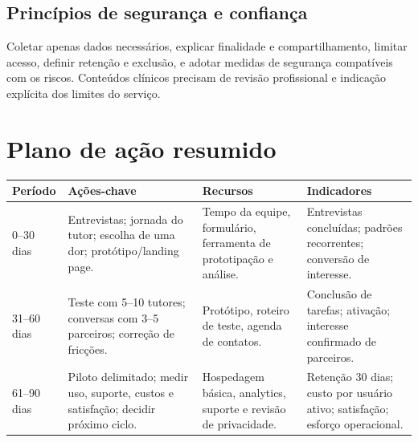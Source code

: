 \documentclass[12pt,a4paper]{article}
\begin{document}
\subsection{Princípios de segurança e confiança}
Coletar apenas dados necessários, explicar finalidade e compartilhamento, limitar acesso, definir retenção e exclusão, e adotar medidas de segurança compatíveis com os riscos. Conteúdos clínicos precisam de revisão profissional e indicação explícita dos limites do serviço.

\section{Plano de ação resumido}
\renewcommand{\arraystretch}{1.2}
\small
\begin{longtable}{p{}p{}p{}p{}}
\toprule
\textbf{Período} & \textbf{Ações-chave} & \textbf{Recursos} & \textbf{Indicadores} \\
\midrule
0--30 dias & Entrevistas; jornada do tutor; escolha de uma dor; protótipo/landing page. & Tempo da equipe, formulário, ferramenta de prototipação e análise. & Entrevistas concluídas; padrões recorrentes; conversão de interesse.\\
31--60 dias & Teste com 5--10 tutores; conversas com 3--5 parceiros; correção de fricções. & Protótipo, roteiro de teste, agenda de contatos. & Conclusão de tarefas; ativação; interesse confirmado de parceiros.\\
61--90 dias & Piloto delimitado; medir uso, suporte, custos e satisfação; decidir próximo ciclo. & Hospedagem básica, analytics, suporte e revisão de privacidade. & Retenção 30 dias; custo por usuário ativo; satisfação; esforço operacional.\\
\bottomrule
\end{longtable}
\normalsize
\end{document}
